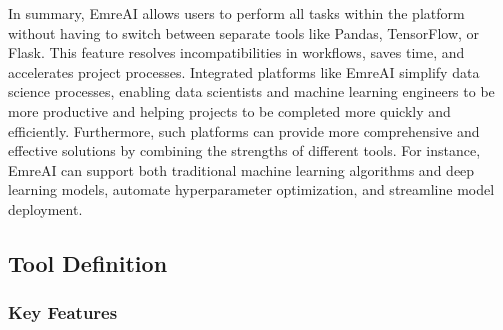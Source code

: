 \documentclass[conference]{IEEEtran}
\begin{document}
In summary, EmreAI allows users to perform all tasks within the platform without having to switch between separate tools like Pandas, TensorFlow, or Flask. This feature resolves incompatibilities in workflows, saves time, and accelerates project processes. Integrated platforms like EmreAI simplify data science processes, enabling data scientists and machine learning engineers to be more productive and helping projects to be completed more quickly and efficiently. Furthermore, such platforms can provide more comprehensive and effective solutions by combining the strengths of different tools. For instance, EmreAI can support both traditional machine learning algorithms and deep learning models, automate hyperparameter optimization, and streamline model deployment.

\subsection{Tool Definition}

\subsubsection{Key Features}
\end{document}
